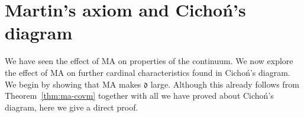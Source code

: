 \documentclass[11pt,oneside]{amsbook}
\newcommand{\set}[1]{\left\{\,#1\,\right\}}
\newcommand{\PP}{\mathbb P}
\newcommand{\Meager}{\mathcal M}
\DeclareMathOperator{\cov}{\mathsf{cov}}
\DeclareMathOperator{\Diff}{Diff}
\DeclareMathOperator{\dom}{dom}
\theoremstyle{definition}
\theoremstyle{plain}
\theoremstyle{definition}
\theoremstyle{remark}
\begin{document}





\section{Martin's axiom and Cicho\'n's diagram}

We have seen the effect of MA on properties of the continuum. We now explore the effect of MA on further cardinal characteristics found in Cicho\'n's diagram. We begin by showing that MA makes $\mathfrak d$ large. Although this already follows from Theorem~\ref{thm:ma-covm} together with all we have proved about Cicho\'n's diagram, here we give a direct proof.
\end{document}
